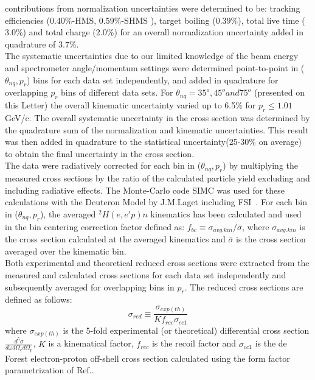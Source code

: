 contributions from normalization uncertainties were determined to be: tracking efficiencies ($0.40 \%$-HMS, $0.59 \%$-SHMS ), target boiling ($0.39 \%$), total live time ($3.0 \%$) and total charge ($2.0\%$)
for an overall normalization uncertainty added in quadrature of $3.7 \%$. \\
\indent The systematic uncertainties due to our limited knowledge of the beam energy and spectrometer angle/momentum settings were determined point-to-point in ($\theta_{nq}, p_{r}$) bins for each data set independently, and added in quadrature for overlapping $p_{r}$ bins
of different data sets. For $\theta_{nq}= 35^{o}, 45^{o} and 75^{o}$ (presented on this Letter) the overall kinematic uncertainty varied up to 6.5$\%$ for $p_{r}\leq1.01$ GeV/c.
The overall systematic uncertainty in the cross section was determined by the quadrature sum of the normalization and kinematic uncertainties. This result was then added in quadrature
to the statistical uncertainty(25-30$\%$ on average) to obtain the final uncertainty in the cross section. \\
\indent The data were radiatively corrected for each bin in ($\theta_{nq}, p_{r}$) by multiplying the measured cross sections by the ratio of the calculated particle yield excluding and including radiative effects. The Monte-Carlo code SIMC was used for these calculations with the Deuteron Model by J.M.Laget including FSI~\cite{LAGET2005}.
For each bin in ($\theta_{nq}, p_{r}$), the averaged $^{2}H(e,e'p)n$ kinematics has been calculated and used in the bin centering correction factor defined as:
$f_{bc} \equiv \sigma_{avg.kin} / \bar{\sigma}$, where $\sigma_{avg.kin}$ is the cross section calculated at the averaged kinematics and $\bar{\sigma}$ is the cross section averaged
over the kinematic bin.\\
\indent Both experimental and theoretical reduced cross sections were extracted from the measured and calculated cross sections for each data set independently and subsequently averaged
for overlapping bins in $p_{r}$. The reduced cross sections are defined as follows:
\begin{equation}
\sigma_{red} \equiv \frac{\sigma_{exp(th)}}{Kf_{rec}\sigma_{cc1}}
\label{eq:1}
\end{equation}
where $\sigma_{exp(th)}$ is the 5-fold experimental (or theoretical) differential cross section $\frac{d^{5}\sigma}{d\omega d\Omega_{e} d\Omega_{p}}$, $K$ is a kinematical factor, $f_{rec}$ is the recoil factor  and $\sigma_{cc1}$ is the de Forest\cite{DEFOREST1983} electron-proton off-shell cross section calculated using the form factor parametrization of Ref.\cite{PhysRevC.69.022201}.
